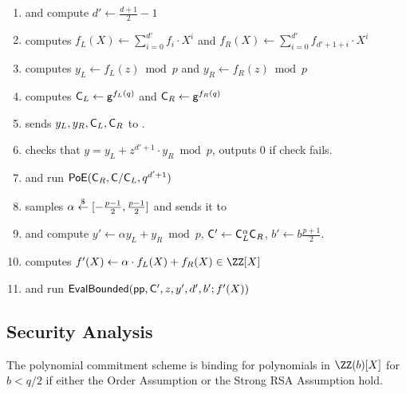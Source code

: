 \begin{small}
\begin{mdframed}
\begin{minipage}{\textwidth}
\begin{enumerate}[nolistsep]
        \item \pcind[1] \prover and \verifier compute $d' \gets \frac{d+1}{2} - 1$
        \item \pcind[1] \prover computes $f_L(X) \gets \sum\limits_{i=0}^{d'} f_i \cdot X^i$ and $f_R(X)\gets\sum\limits_{i=0}^{d'} f_{d'+1+i}\cdot X^{i}$
        \item \pcind[1] \prover computes $y_L\gets f_L(z) \bmod p$ and $y_R\gets f_R(z)\bmod p$
        \item \pcind[1] \prover computes $\mathsf{C}_L \gets \mathsf{g}^{f_L(q)}$ and $\mathsf{C}_R \gets \mathsf{g}^{f_R(q)}$
        \item \pcind[1] \prover sends $y_L,y_R, \mathsf{C}_L, \mathsf{C}_R$ to \verifier. 
        \item \pcind[1] \verifier checks that $y=y_L+z^{d'+1}\cdot y_R \bmod p$, outputs $0$ if check fails.
        \item \pcind[1] \label{line:PoE} \prover and \verifier run $\textsf{{PoE}}(\mathsf{C}_R, \mathsf{C}/\mathsf{C}_L, q^{d'+1})$
        \item \pcind[1] \verifier samples $\alpha \overset{\$}{\gets} [-\frac{p-1}{2},\frac{p-1}{2}]$ and sends it to \prover
        \item \pcind[1] \prover and \verifier compute $y'\gets\alpha  y_L +y_R \bmod p$, $\mathsf{C}' \gets \mathsf{C}_L^\alpha  \mathsf{C}_R$, $b'\gets b \frac{p+1}{2}$. 
        \item \pcind[1] \prover computes $f'(X) \gets \alpha \cdot f_L(X) + f_R(X) \in \ZZ[X]$ 
        \item \pcind[1] \prover and \verifier run $\textsf{{EvalBounded}}(\textsf{pp}, \mathsf{C}', z, y', d',b' ; f'(X))$
               \end{enumerate}
      \end{minipage}
\end{mdframed}
\end{small}


\begin{comment}
\end{comment}

\subsection{Security Analysis} 
 \newcommand{\bindinglemma}{
 The polynomial commitment scheme is binding for polynomials in $\ZZ(b)[X]$ for $b<q/2$ if either the Order Assumption or the Strong RSA Assumption hold.
	}
\begin{lemma}
\label{lem:binding}
	\bindinglemma
	\end{lemma}

